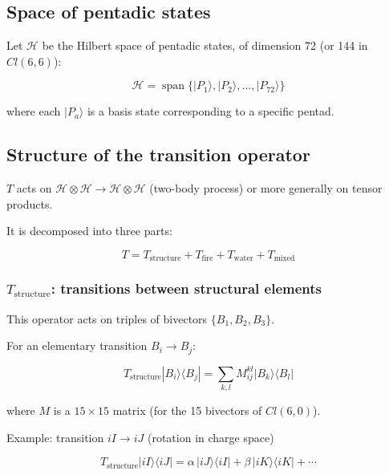 \documentclass[11pt]{article}
\begin{document}
\hypertarget{space-of-pentadic-states}{%
\subsection{Space of pentadic states}\label{space-of-pentadic-states}}

Let \(\mathcal{H}\) be the Hilbert space of pentadic states, of
dimension 72 (or 144 in \(Cl(6,6)\)):

\[
\mathcal{H} = \operatorname{span}\{ |P_1\rangle, |P_2\rangle, \dots, |P_{72}\rangle \}
\]

where each \(|P_a\rangle\) is a basis state corresponding to a specific
pentad.

\hypertarget{structure-of-the-transition-operator}{%
\subsection{Structure of the transition
operator}\label{structure-of-the-transition-operator}}

\(T\) acts on
\(\mathcal{H}\otimes\mathcal{H} \to \mathcal{H}\otimes\mathcal{H}\)
(two-body process) or more generally on tensor products.

It is decomposed into three parts:

\[
T = T_{\text{structure}} + T_{\text{fire}} + T_{\text{water}} + T_{\text{mixed}}
\]

\hypertarget{t_textstructure-transitions-between-structural-elements}{%
\subsubsection{\texorpdfstring{\(T_{\text{structure}}\): transitions
between structural
elements}{T\_\{\textbackslash text\{structure\}\}: transitions between structural elements}}\label{t_textstructure-transitions-between-structural-elements}}

This operator acts on triples of bivectors \(\{B_1,B_2,B_3\}\).

For an elementary transition \(B_i \to B_j\):

\[
T_{\text{structure}} |B_i\rangle\langle B_j| = \sum_{k,l} M_{ij}^{kl} |B_k\rangle\langle B_l|
\]

where \(M\) is a \(15\times15\) matrix (for the 15 bivectors of
\(Cl(6,0)\)).

Example: transition \(iI \to iJ\) (rotation in charge space)

\[
T_{\text{structure}} |iI\rangle\langle iJ| = \alpha\, |iJ\rangle\langle iI| + \beta\, |iK\rangle\langle iK| + \cdots
\]
\end{document}
